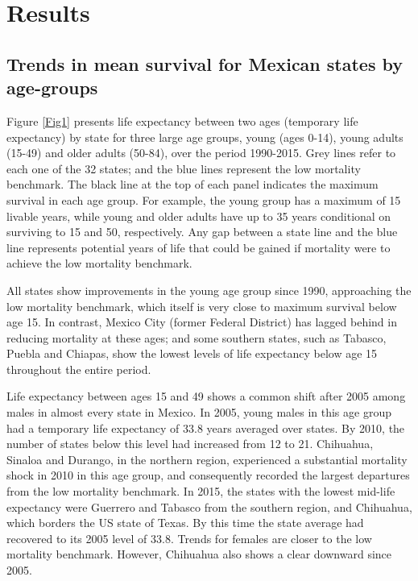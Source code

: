 \documentclass{bmcart}
\begin{document}
\section*{Results}

\subsection*{Trends in mean survival for Mexican states by age-groups}

Figure \ref{Fig1} presents life expectancy between two ages (temporary life expectancy) by state  for three large age groups, young (ages 0-14), young adults (15-49) and older adults (50-84), over the period 1990-2015. Grey lines refer to each one of the 32 states; and the blue lines represent the low mortality benchmark. The black line at the top of each panel indicates the maximum survival in each age group. For example, the young group has a maximum of 15 livable years, while young and older adults have up to 35 years conditional on surviving to 15 and 50, respectively. Any gap between a state line and the blue line represents potential years of life that could be gained if mortality were to achieve the low mortality benchmark.

All states show improvements in the young age group since 1990, approaching the low mortality benchmark, which itself is very close to maximum survival below age 15. In contrast, Mexico City (former Federal District) has lagged behind in reducing mortality at these ages; and some southern states, such as Tabasco, Puebla and Chiapas, show the lowest levels of life expectancy below age 15 throughout the entire period.


Life expectancy between ages 15 and 49 shows a common shift after 2005 among males in almost every state in Mexico. In 2005, young males in this age group had a temporary life expectancy of 33.8 years averaged over states. By 2010, the number of states below this level had increased from 12 to 21. Chihuahua, Sinaloa and Durango, in the northern region, experienced a substantial mortality shock in 2010 in this age group, and consequently recorded the largest departures from the low mortality benchmark. In 2015, the states with the lowest mid-life expectancy were Guerrero and Tabasco from the southern region, and Chihuahua, which borders the US state of Texas. By this time the state average had recovered to its 2005 level of 33.8. Trends for females are closer to the low mortality benchmark. However, Chihuahua also shows a clear downward since 2005.
\end{document}
